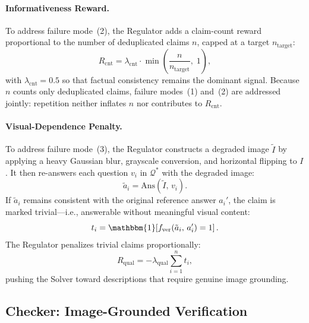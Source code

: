\paragraph{Informativeness Reward.}
To address failure mode~(2), the Regulator adds a claim-count reward
proportional to the number of deduplicated claims $n$, capped at a target
$n_{\mathrm{target}}$:
\begin{equation}
    R_{\mathrm{cnt}}
    = \lambda_{\mathrm{cnt}}
      \cdot \min\!\left(\frac{n}{n_{\mathrm{target}}},\; 1\right),
\end{equation}
with $\lambda_{\mathrm{cnt}} = 0.5$ so that factual consistency remains
the dominant signal.
Because $n$ counts only deduplicated claims, failure modes~(1) and~(2)
are addressed jointly: repetition neither inflates $n$ nor contributes
to $R_{\mathrm{cnt}}$.

\paragraph{Visual-Dependence Penalty.}
To address failure mode~(3), the Regulator constructs a degraded image
$\tilde{I}$ by applying a heavy Gaussian blur, grayscale conversion, and
horizontal flipping to $I$.
It then re-answers each question $v_i$ in $\mathcal{Q}^{\ast}$ with the
degraded image:
\begin{equation}
    \tilde{a}_i = \mathrm{Ans}(\tilde{I},\, v_i).
\end{equation}
If $\tilde{a}_i$ remains consistent with the original reference answer
$a_i'$, the claim is marked trivial---i.e., answerable without meaningful
visual content:
\begin{equation}
    t_i = \mathbbm{1}\!\left[
        f_{\mathrm{ver}}(\tilde{a}_i,\, a_i') = 1
    \right].
\end{equation}
The Regulator penalizes trivial claims proportionally:
\begin{equation}
    R_{\mathrm{qual}} = -\lambda_{\mathrm{qual}} \sum_{i=1}^{n} t_i,
\end{equation}
pushing the Solver toward descriptions that require genuine image grounding.


\subsection{Checker: Image-Grounded Verification}
\label{sec:checker}

